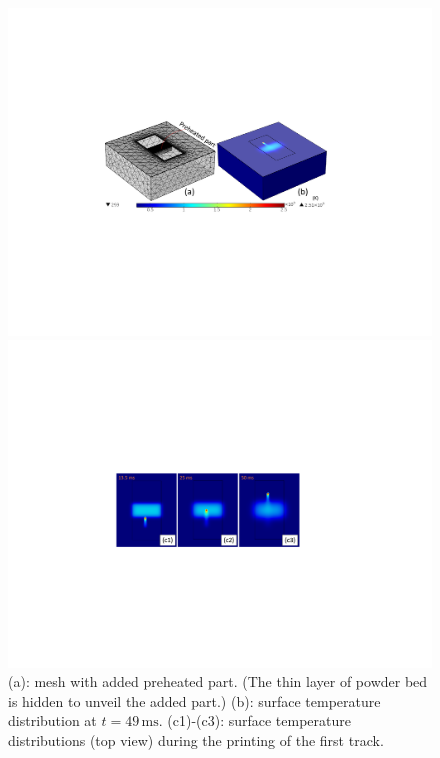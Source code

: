 \documentclass [11pt, proquest] {uwthesis}[2020/02/24]
\begin{document}
\begin{figure}[!ht]
\begin{centering}
\includegraphics[clip,width=13cm]{Closed-loop-simulation/crosslayer_tem_mesh}
\par\end{centering}
\begin{centering}
\includegraphics[clip,width=13cm]{Closed-loop-simulation/crosslayer_three}
\par\end{centering}
\centering{}\caption{\label{fig:Mesh-with-added}(a): mesh with added preheated part. (The
thin layer of powder bed is hidden to unveil the added part.) (b):
surface temperature distribution at $t=49\,\text{ms}$. (c1)-(c3):
surface temperature distributions (top view) during the printing of
the first track.}
\end{figure}
\end{document}
